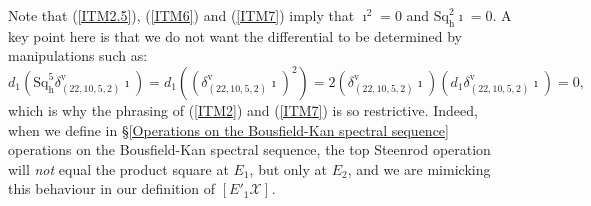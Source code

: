 \documentclass[11pt]{amsart} \renewcommand{\baselinestretch}{1.4}
\theoremstyle{plain}
\theoremstyle{definition}
\newcommand{\scrC}{\mathscr{C}}
\newcommand{\calx}{\mathcal{X}}
\newcommand{\CommOperad}{{\scrC}}
\newcommand{\minDimP}{\overline{m}}
\newcommand{\excess}{e}
\newcommand{\Sq}{\mathrm{Sq}}
\newcommand{\Eprime}[5]{[E'_{#2}#3]^{#4}_{#5}}
\newcommand{\uver}{^\mathrm{v}}
\newcommand{\dhor}{_\mathrm{h}}
\newcommand{\Sqh}{\mathrm{Sq}\dhor}
\newcommand{\deltav}{\delta\uver}
\begin{document}
\begin{Calculations of HWn for n nonzero}
Note that (\ref{ITM2.5}), (\ref{ITM6}) and (\ref{ITM7}) imply that $\imath^2=0$ and $\Sqh^{2}\imath=0$.
A key point here is that we do not want the differential to be determined by manipulations such as:
\[d_1(\Sqh^5\deltav_{(22,10,5,2)}\imath) = d_1((\deltav_{(22,10,5,2)}\imath)^{2})=
2(\deltav_{(22,10,5,2)}\imath)(d_1\deltav_{(22,10,5,2)}\imath)
=0,\]
which is why the phrasing of (\ref{ITM2}) and (\ref{ITM7}) is so restrictive.
Indeed, when we define in \S\ref{Operations on the Bousfield-Kan spectral sequence} operations on the Bousfield-Kan spectral sequence,  the top Steenrod operation will \emph{not} equal the product square at $E_1$, but only at $E_2$, and we are mimicking  this behaviour in our definition of $\Eprime{blank}{1}{\calx}{}{}$.


\end{Calculations of HWn for n nonzero}
\end{document}
